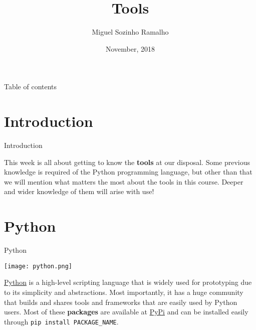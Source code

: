 \documentclass[aspectratio=43]{beamer}
\title{\q Tools}
\date{November, 2018}
\author[Ramalho]{Miguel Sozinho Ramalho}
\begin{document}
\begin{frame}
	\titlepage
\end{frame}


\begin{frame}{Table of contents}
	\begin{card}
		\tableofcontents
	\end{card}
\end{frame}


\section{Introduction}
\begin{frame}{Introduction}
    \begin{card}
    This week is all about getting to know the \textbf{tools} at our disposal. Some previous knowledge is required of the Python programming language, but other than that we will mention what matters the most about the tools in this course. Deeper and wider knowledge of them will arise with use!
    \end{card}
\pagenumber
\end{frame}


\section{Python}
\begin{frame}{Python}
    \begin{center}
	    \texttt{[image: python.png]}
	\end{center}
    \begin{card}
        \href{https://www.python.org/}{Python} is a high-level scripting language that is widely used for prototyping due to its simplicity and abstractions. Most importantly, it has a huge community that builds and shares tools and frameworks that are easily used by Python users. Most of these \textbf{packages} are available at \href{https://pypi.org/}{PyPi} and can be installed easily through \texttt{pip install PACKAGE_NAME}. 
    \end{card}
\pagenumber
\end{frame}
\end{document}
